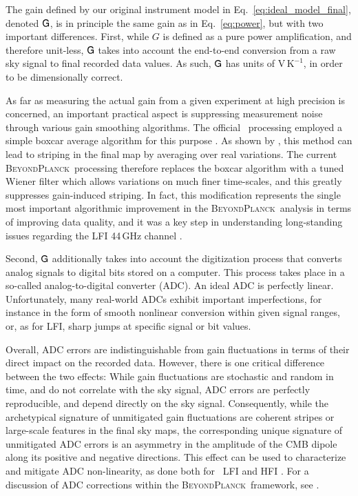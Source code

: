 \documentclass[onecolumn]{aa}
\renewcommand{\G}[0]{\tens{G}}
\newcommand{\BP}{\textsc{BeyondPlanck}}
\begin{document}
The gain defined by our original instrument model in
Eq.~\eqref{eq:ideal_model_final}, denoted $\G$, is in principle the same
gain as in Eq.~\eqref{eq:power}, but with two important
differences. First, while $G$ is defined as a pure power
amplification, and therefore unit-less, $\G$ takes into account the
end-to-end conversion from a raw sky signal to final recorded data
values. As such, $\G$ has units of $\mathrm{V}\,\mathrm{K}^{-1}$, in
order to be dimensionally correct.

As far as measuring the actual gain from a given experiment at high
precision is concerned, an important practical aspect is suppressing
measurement noise through various gain smoothing algorithms. The
official \Planck\ processing employed a simple boxcar average
algorithm for this purpose \citep{planck2014-a03,planck2016-l06}. As
shown by \citet{bp07}, this method can lead to striping in the final
map by averaging over real variations. The current \BP\ processing
therefore replaces the boxcar algorithm with a tuned Wiener filter
which allows variations on much finer time-scales, and this greatly
suppresses gain-induced striping. In fact, this modification
represents the single most important algorithmic improvement in the
\BP\ analysis in terms of improving data quality, and it was a key
step in understanding long-standing issues regarding the LFI 44\,GHz
channel \citep{planck2016-l02,planck2016-l05}.

Second, $\G$ additionally takes into account the digitization process
that converts analog signals to digital bits stored on a
computer. This process takes place in a so-called analog-to-digital
converter (ADC). An ideal ADC is perfectly linear. Unfortunately, many
real-world ADCs exhibit important imperfections, for instance in the
form of smooth nonlinear conversion within given signal ranges, or,
as for LFI, sharp jumps at specific signal or bit values.

Overall, ADC errors are indistinguishable from gain fluctuations in
terms of their direct impact on the recorded data. However, there is
one critical difference between the two effects: While gain
fluctuations are stochastic and random in time, and do not correlate
with the sky signal, ADC errors are perfectly reproducible, and depend
directly on the sky signal. Consequently, while the archetypical
signature of unmitigated gain fluctuations are coherent stripes or
large-scale features in the final sky maps, the corresponding unique
signature of unmitigated ADC errors is an asymmetry in the amplitude
of the CMB dipole along its positive and negative directions. This
effect can be used to characterize and mitigate ADC non-linearity, as
done both for \Planck\ LFI and HFI
\citep{planck2016-l02,planck2016-l03,planck2020-LVII}. For a
discussion of ADC corrections within the \BP\ framework, see
\citet{bp25}.
\end{document}
